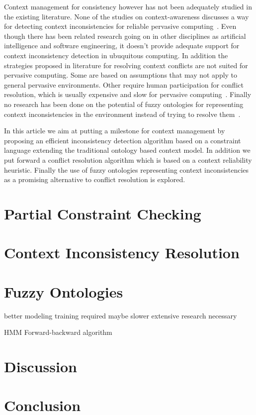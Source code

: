 \documentclass[journal]{vgtc}                %
\begin{document}
Context management for consistency however has not been adequately studied in the existing literature. None of the studies on context-awareness discusses a way for detecting context inconsistencies for reliable pervasive computing~\cite{xu:2010:PCC, bu:2006:CCM}. Even though there has been related research going on in other disciplines as artificial intelligence and software engineering, it doesn't provide adequate support for context inconsistency detection in ubuquitous computing. In addition the strategies proposed in literature for resolving context conflicts are not suited for pervasive computing. Some are based on assumptions that may not apply to general pervasive environments. Other require human participation for conflict resolution, which is usually expensive and slow for pervasive computing~\cite{xu:2010:PCC}. Finally no research has been done on the potential of fuzzy ontologies for representing context inconsistencies in the environment instead of trying to resolve them~\cite{ko:2009:IOFO}.

In this article we aim at putting a milestone for context management by proposing an efficient inconsistency detection algorithm based on a constraint language extending the traditional ontology based context model. In addition we put forward a conflict resolution algorithm which is based on a context reliability heuristic. Finally the use of fuzzy ontologies representing context inconsistencies as a promising alternative to conflict resolution is explored.








\section{Partial Constraint Checking}

\section{Context Inconsistency Resolution}

\section{Fuzzy Ontologies}

better modeling
training required
maybe slower
extensive research necessary

HMM
Forward-backward algorithm

\section{Discussion}

\section{Conclusion}




\end{document}
